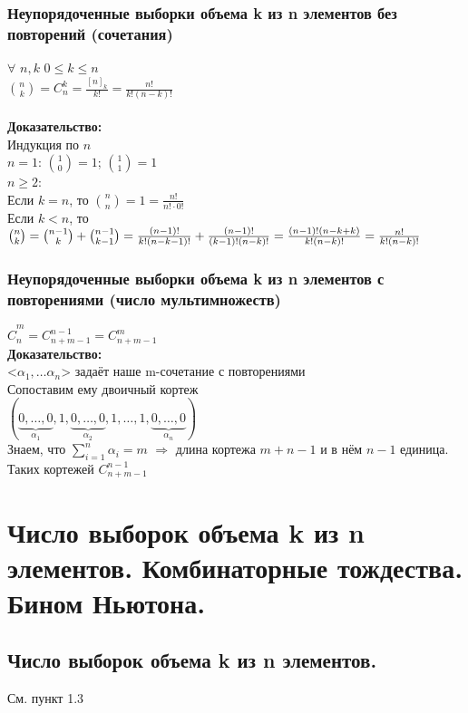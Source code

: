 \documentclass[12pt]{article}
\begin{document}
\subsubsection{Неупорядоченные выборки объема k из n элементов без повторений (сочетания)}
	$\forall$ $n,k$ $0 \leqslant k \leqslant n$\\
	$\binom{n}{k} = C_n^k = \frac{[n]_k}{k!} = \frac{n!}{k!(n-k)!}$\\\\
	\textbf{Доказательство:}\\
	Индукция по $n$\\
	$n = 1$: $\binom{1}{0} = 1$; $\binom{1}{1} = 1$\\
	$n \geqslant 2$:\\
	Если $k = n$, то $\binom{n}{n} = 1 = \frac{n!}{n!\cdot0!}$\\
	Если $k < n$, то\\
	$\binom{n}{k} = \binom{n-1}{k} + \binom{n-1}{k-1} = \frac{(n-1)!}{k!(n-k-1)!} + \frac{(n-1)!}{(k-1)!(n-k)!} = \frac{(n-1)!(n-k+k)}{k!(n-k)!} = \frac{n!}{k!(n-k)!}\\$
	\qedsymbol\\
\subsubsection{Неупорядоченные выборки объема k из n элементов с повторениями (число мультимножеств)}
	$\widehat{C}^m_n = C^{n-1}_{n+m-1} = C^{m}_{n+m-1}$\\
	\textbf{Доказательство:}\\
	<$\alpha_1,\dotsc\alpha_n$> задаёт наше m-сочетание с повторениями\\
	Сопоставим ему двоичный кортеж\\
	$(\underbrace{0,\dotsc,0}_{\alpha_1},1,\underbrace{0,\dotsc,0}_{\alpha_2},1,\dotsc,1,\underbrace{0,\dotsc,0}_{\alpha_n})$\\
	Знаем, что $\displaystyle\sum_{i=1}^{n}\alpha_i = m$ $\Rightarrow$ длина кортежа $m + n - 1$ и в нём $n-1$ единица. Таких кортежей $C^{n-1}_{n+m-1}$\\
	\qedsymbol

\section{Число выборок объема k из n элементов. Комбинаторные тождества. Бином Ньютона.}
\subsection{Число выборок объема k из n элементов.}
	См. пункт 1.3
\end{document}
